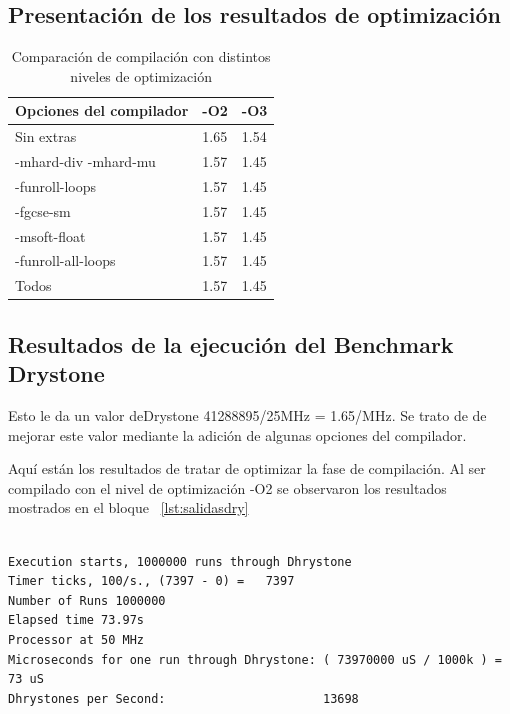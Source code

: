 	\subsection {Presentación de los resultados de optimización} 
\begin{table}[h!]
\begin{center}
\begin{tabular}{ |l |l| l|}
\hline
\rowcolor[gray]{0.8} Opciones del compilador&-O2&-O3 \\
\hline
Sin extras 					&1.65 			&1.54\\
\hline
-mhard-div -mhard-mu 		& 1.57			&1.45\\
\hline
-funroll-loops			 	& 1.57			& 1.45 \\
\hline
-fgcse-sm					& 1.57			& 1.45 \\
\hline
-msoft-float 				& 1.57			&1.45  \\
\hline
-funroll-all-loops	 		& 1.57			& 1.45 \\
\hline
Todos	 					& 1.57			& 1.45 \\
\hline
\end{tabular}
\end{center}
\caption{Comparación de compilación con distintos niveles de optimización}
\end{table}
\newpage

		\subsection{Resultados de la ejecución del Benchmark Drystone}

Esto le da un valor deDrystone 41288895/25MHz = 1.65/MHz. Se trato de de mejorar este valor mediante la adición de algunas opciones del compilador.

Aquí están los resultados de tratar de optimizar la fase de compilación. Al ser compilado con el nivel de optimización -O2 se observaron los resultados mostrados en el bloque ~\ref{lst:salidasdry} 

\begin{lstlisting}[frame=single,caption={Sin optimizaciones },label={lst:salidas},breaklines]

Execution starts, 1000000 runs through Dhrystone
Timer ticks, 100/s., (7397 - 0) =	7397
Number of Runs 1000000
Elapsed time 73.97s
Processor at 50 MHz
Microseconds for one run through Dhrystone: ( 73970000 uS / 1000k ) = 73 uS
Dhrystones per Second:                      13698 
\end{lstlisting}

